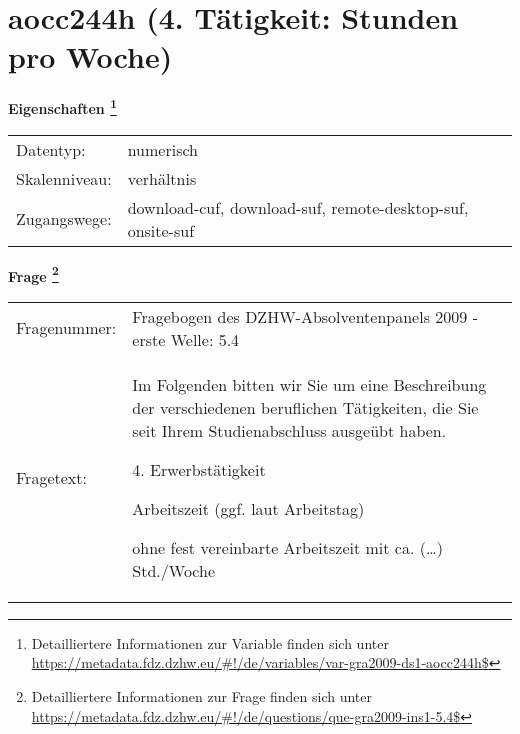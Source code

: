 
    \setcounter{footnote}{0}

    \vspace*{-1.8cm}
	\section{aocc244h (4. Tätigkeit: Stunden pro Woche)}
	\label{section:aocc244h}



    \vspace*{0.5cm}
    \noindent\textbf{Eigenschaften
	\footnote{Detailliertere Informationen zur Variable finden sich unter
		\url{https://metadata.fdz.dzhw.eu/\#!/de/variables/var-gra2009-ds1-aocc244h$}}}\\
	\begin{tabularx}{\hsize}{@{}lX}
	Datentyp: & numerisch \\
	Skalenniveau: & verhältnis \\
	Zugangswege: &
	  download-cuf, 
	  download-suf, 
	  remote-desktop-suf, 
	  onsite-suf
 \\
    \end{tabularx}



				\vspace*{0.5cm}
                \noindent\textbf{Frage
	                \footnote{Detailliertere Informationen zur Frage finden sich unter
		              \url{https://metadata.fdz.dzhw.eu/\#!/de/questions/que-gra2009-ins1-5.4$}}}\\
				\begin{tabularx}{\hsize}{@{}lX}
					Fragenummer: &
					  Fragebogen des DZHW-Absolventenpanels 2009 - erste Welle:
					  5.4
 \\
					Fragetext: & Im Folgenden bitten wir Sie um eine Beschreibung der verschiedenen beruflichen Tätigkeiten, die Sie seit Ihrem Studienabschluss ausgeübt haben.\par  4. Erwerbstätigkeit\par  Arbeitszeit (ggf. laut Arbeitstag)\par  ohne fest vereinbarte Arbeitszeit mit ca. (…) Std./Woche \\
				\end{tabularx}





